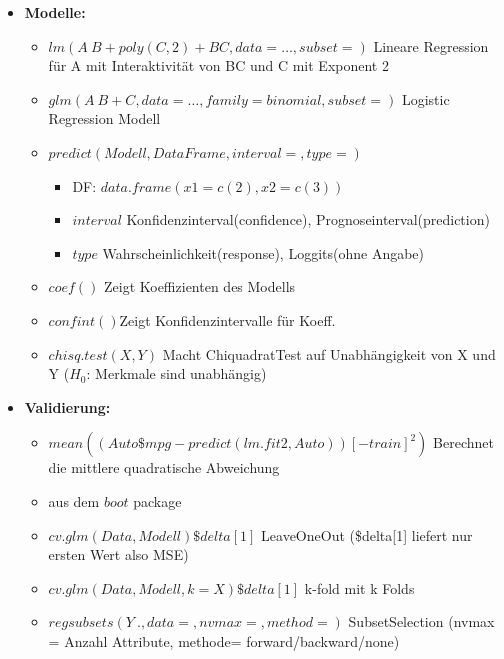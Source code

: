 \documentclass[a4paper]{article}
\begin{document}
\begin{landscape}
\begin{multicols}{3}
\begin{itemize} [noitemsep,nolistsep,leftmargin=*]
            \item \textbf{Modelle:}
            \begin{itemize}[noitemsep,nolistsep,leftmargin=*]
            \item $lm(A ~ B + poly(C,2) + BC, data = \dots, subset=)$ Lineare Regression für A mit Interaktivität von BC und C mit Exponent 2
            \item $glm(A ~ B + C, data=\dots, family = binomial, subset=)$ Logistic Regression Modell
            \item $predict(Modell, DataFrame, interval= , type= )$
                \begin{itemize}[noitemsep,nolistsep,leftmargin=*]
                    \item DF: $data.frame(x1 = c(2), x2 = c(3))$ 
                    \item $interval$ Konfidenzinterval(confidence), Prognoseinterval(prediction)
                    \item $type$ Wahrscheinlichkeit(response), Loggits(ohne Angabe)
                \end{itemize}
            \item $coef()$ Zeigt Koeffizienten des Modells
            \item $confint()$Zeigt  Konfidenzintervalle für Koeff.
            \item $chisq.test(X,Y)$ Macht ChiquadratTest auf Unabhängigkeit von X und Y ($H_0$: Merkmale sind unabhängig)
            \end{itemize}

            \item \textbf{Validierung:}
            \begin{itemize}[noitemsep,nolistsep,leftmargin=*]
                \item $mean((Auto\$mpg - predict(lm.fit2, Auto))[-train]^2)$ Berechnet die mittlere quadratische Abweichung
                \item aus dem $boot$ package
                \item $cv.glm(Data,Modell)\$delta[1]$ LeaveOneOut (\$delta[1] liefert nur ersten Wert also MSE)
                \item $cv.glm(Data,Modell, k=X)\$delta[1]$ k-fold mit k Folds
                \item $regsubsets(Y ~ ., data = , nvmax =, method = )$ SubsetSelection (nvmax = Anzahl Attribute, methode= forward/backward/none)
            \end{itemize}


\end{itemize}
\end{multicols}
\end{landscape}
\end{document}
